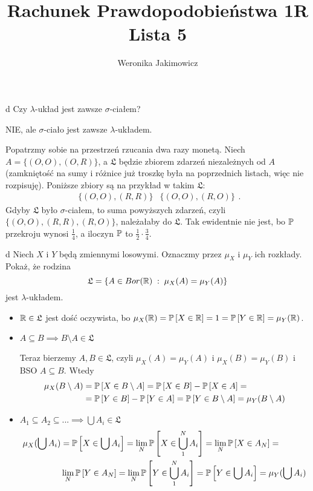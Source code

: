 \documentclass{article}
\title{Rachunek Prawdopodobieństwa 1R\\{\normalsize Lista 5}}
\author{Weronika Jakimowicz}
\date{}
\begin{document}
\maketitle\thispagestyle{empty}

\begin{problem}[1]{d}
Czy $\lambda$-układ jest zawsze $\sigma$-ciałem?
\end{problem}

NIE, ale $\sigma$-ciało jest zawsze $\lambda$-układem.

Popatrzmy sobie na przestrzeń rzucania dwa razy monetą. Niech $A=\{(O, O), (O, R)\}$, a $\mathfrak{L}$ będzie zbiorem zdarzeń niezależnych od $A$ (zamkniętość na sumy i różnice już troszkę była na poprzednich listach, więc nie rozpisuję). Poniższe zbiory są na przykład w takim $\mathfrak{L}$:
$$\begin{matrix}\{(O, O), (R, R)\} & \{(O, O), (R, O)\}\end{matrix}.$$
Gdyby $\mathfrak{L}$ było $\sigma$-ciałem, to suma powyższych zdarzeń, czyli $\{(O, O), (R, R), (R, O)\}$, należałaby do $\mathfrak{L}$. Tak ewidentnie nie jest, bo $\prob$ przekroju wynosi $\frac{1}{4}$, a iloczyn $\prob$ to $\frac{1}{2}\cdot\frac{3}{4}$.

\begin{problem}[2]{d}
Niech $X$ i $Y$ będą zmiennymi losowymi. Oznaczmy przez $\mu_X$ i $\mu_Y$ ich rozkłady. Pokaż, że rodzina
$$\mathfrak{L}=\{A\in Bor(\mathbb{R})\;:\;\mu_X(A)=\mu_Y(A)\}$$
jest $\lambda$-układem.
\end{problem}

\begin{itemize}
    \item $\mathbb{R}\in\mathfrak{L}$ jest dość oczywista, bo $\mu_X(\R)=\prob{X\in\R}=1=\prob{Y\in\R}=\mu_Y(\R)$.
    \item $A\subseteq B\implies B\setminus A\in\mathfrak{L}$

    Teraz bierzemy $A,B\in\mathfrak{L}$, czyli $\mu_X(A)=\mu_Y(A)$ i $\mu_X(B)=\mu_Y(B)$ i BSO $A\subseteq B$. Wtedy
    \begin{align*}
        \mu_X(B\setminus A)&=\prob{X\in B\setminus A}=\prob{X\in B}-\prob{X\in A}=\\
        &=\prob{Y\in B}-\prob{Y\in A}=\prob{Y\in B\setminus A}=\mu_Y(B\setminus A)
    \end{align*}
    \item $A_1\subseteq A_2\subseteq...\implies\bigcup A_i\in\mathfrak{L}$
    \begin{align*}
        \mu_X(\bigcup A_i)&=\prob{X\in\bigcup A_i}=\lim_N\prob{X\in\bigcup_1^NA_i}=\lim_N\prob{X\in A_N}=\\
        &\lim_N\prob{Y\in A_N}=\lim_N\prob{Y\in\bigcup_1^NA_i}=\prob{Y\in\bigcup A_i}=\mu_Y(\bigcup A_i)
    \end{align*}
\end{itemize}
\end{document}
